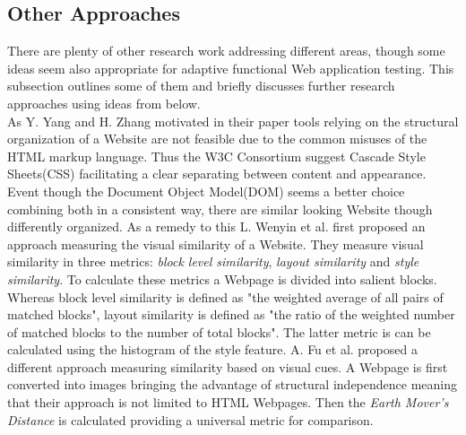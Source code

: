 \documentclass[12pt, notitlepage]{article}
\begin{document}
\subsection{Other Approaches}
There are plenty of other research work addressing different areas, though some ideas seem also appropriate for adaptive functional
Web application testing. This subsection outlines some of them and briefly discusses further research approaches using ideas from
below.\\
As Y. Yang and H. Zhang\cite{page-analysis_visual} motivated in their paper tools relying on the structural organization of a
Website are not feasible due to the common misuses of the HTML markup language. Thus the W3C Consortium suggest Cascade Style Sheets(CSS\cite{css3}) facilitating a clear separating between content and appearance. Event though the Document Object Model(DOM\cite{dom})
seems a better choice combining both in a consistent way, there are similar looking Website though differently organized.  
As a remedy to this L. Wenyin et al.\cite{phishing-visual} first proposed an approach measuring the visual similarity of a Website.
They measure visual similarity in three metrics: \textit{block level similarity}, \textit{layout similarity} and
\textit{style similarity}. To calculate these metrics a Webpage is divided into salient blocks. Whereas block level similarity is defined as "the weighted average of all pairs of matched blocks", layout similarity is defined as "the ratio of the weighted number
of matched blocks to the number of total blocks". The latter metric is can be calculated using the histogram of the style feature. 
A. Fu et al.\cite{emd} proposed a different approach measuring similarity based on visual cues. A Webpage is first converted into 
images bringing the advantage of structural independence meaning that their approach is not limited to HTML Webpages. Then the
\textit{Earth Mover's Distance}\cite{emd-def} is calculated providing a universal metric for comparison. \\


\newpage


\end{document}
